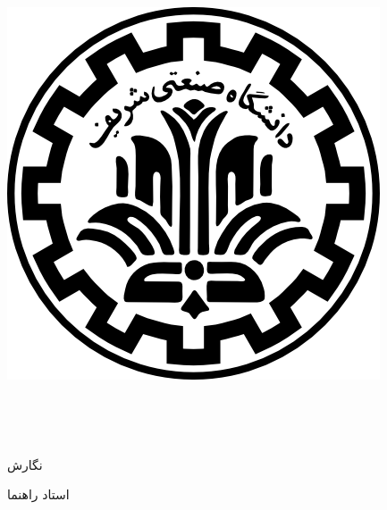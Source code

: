 
\begin{center}

\includegraphics[scale=0.2]{front/template/images/logo.png}

\vspace{-0.2cm}
\ThesisUniversity \\[-0.3em]
\ThesisDepartment

\begin{large}
\vspace{0.5cm}

\ThesisType \ \ThesisDegree \\[-0.3em]
\ThesisMajor

\end{large}

\vspace{2cm}

{\LARGE\textbf{\ThesisTitle}}

\vspace{2cm}

{نگارش}\\[.5em]
{\large\textbf{\ThesisAuthor}}

\vspace{0.7cm}

{استاد راهنما}\\[.5em]
{\large\textbf{\ThesisSupervisor}}

\vspace{1.3cm}

\ThesisDate

\end{center}

\newpage

